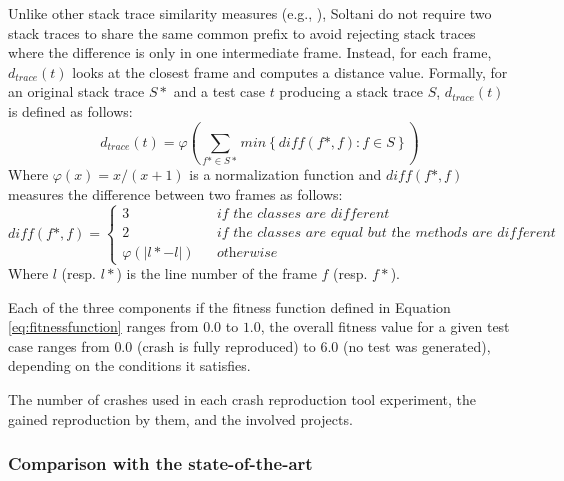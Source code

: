Unlike other stack trace similarity measures (e.g., \cite{Rossler2013}), Soltani \etal \cite{Soltani2018a} do not require two stack traces to share the same common prefix to avoid rejecting stack traces where the difference is only in one intermediate frame. Instead, for each frame, $d_{trace}(t)$ looks at the closest frame and computes a distance value. Formally, for an original stack trace $S*$ and a test case $t$ producing a stack trace $S$, $d_{trace}(t)$ is defined as follows:
%
\begin{equation}
d_{trace}(t) = \varphi \left( \sum_{f* \in S*} min \left\lbrace \mathit{diff}(f*, f) : f \in S \right\rbrace \right)
\end{equation}
%
Where $\varphi (x) = x / (x+1)$ is a normalization function \cite{McMinn2004} and $\mathit{diff}(f*, f)$ measures the difference between two frames as follows: 
%
\begin{equation}
\mathit{diff}(f*, f) = 
\left\{
  \begin{array}{lcr}
    3 && \textit{if the classes are different}\\
    2  && \textit{if the classes are equal but the methods are different}\\
     \varphi \left( \vert l* - l \vert \right)   && \textit{otherwise}
  \end{array}
\right.
\end{equation}
%
Where $l$ (resp. $l*$) is the line number of the frame $f$ (resp. $f*$).

Each of the three components if the fitness function defined in Equation \ref{eq:fitnessfunction} ranges from $0.0$ to $1.0$, the overall fitness value for a given test case ranges from $0.0$ (crash is fully reproduced) to $6.0$ (no test was generated), depending on the conditions it satisfies. 


\begin{table}[t]
	\centering
	\caption{The number of crashes used in each crash reproduction tool experiment, the gained reproduction by them, and the involved projects.}
	\label{tab:background:represults}
	
\end{table}

\subsubsection{Comparison with the state-of-the-art}



